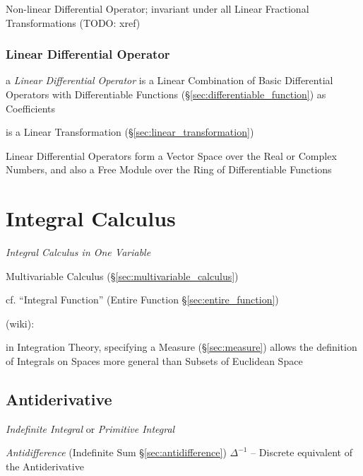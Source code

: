Non-linear Differential Operator; invariant under all Linear Fractional
Transformations (TODO: xref)



\subsubsection{Linear Differential Operator}
\label{sec:linear_differential_operator}

a \emph{Linear Differential Operator} is a Linear Combination of Basic
Differential Operators with Differentiable Functions
(\S\ref{sec:differentiable_function}) as Coefficients

is a Linear Transformation (\S\ref{sec:linear_transformation})

Linear Differential Operators form a Vector Space over the Real or Complex
Numbers, and also a Free Module over the Ring of Differentiable Functions



\section{Integral Calculus}\label{sec:integral_calculus}

\emph{Integral Calculus in One Variable}

\fist Multivariable Calculus (\S\ref{sec:multivariable_calculus})

cf. ``Integral Function'' (Entire Function \S\ref{sec:entire_function})

(wiki):

in Integration Theory, specifying a Measure (\S\ref{sec:measure}) allows the
definition of Integrals on Spaces more general than Subsets of Euclidean Space



\subsection{Antiderivative}\label{sec:antiderivative}

\emph{Indefinite Integral} or \emph{Primitive Integral}

\fist \emph{Antidifference} (Indefinite Sum \S\ref{sec:antidifference})
$\Delta^{-1}$ -- Discrete equivalent of the Antiderivative

